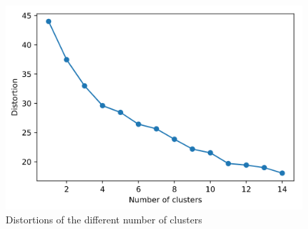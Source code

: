 \begin{figure}[h]
    \centering
    \includegraphics[scale=0.45]{elbow.png}
    \caption{Distortions of the different number of clusters}
    \label{fig:elbow}
\end{figure}

